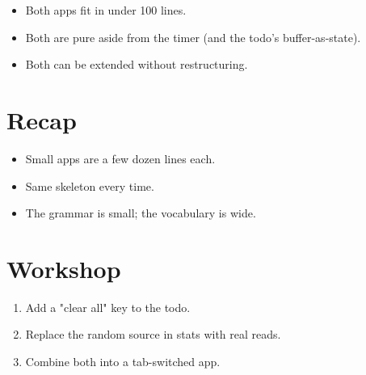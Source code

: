 \begin{itemize}[leftmargin=*]
  \item Both apps fit in under 100 lines.
  \item Both are pure aside from the timer (and the
    todo's buffer-as-state).
  \item Both can be extended without restructuring.
\end{itemize}

\section{Recap}

\begin{recap}
\begin{itemize}[leftmargin=*]
  \item Small apps are a few dozen lines each.
  \item Same skeleton every time.
  \item The grammar is small; the vocabulary is wide.
\end{itemize}
\end{recap}

\section*{Workshop}

\begin{enumerate}[leftmargin=*]
  \item Add a "clear all" key to the todo.
  \item Replace the random source in stats with real  reads.
  \item Combine both into a tab-switched app.
\end{enumerate}
